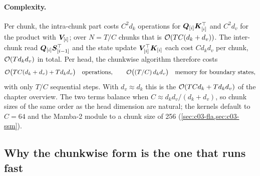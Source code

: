 \paragraph{Complexity.}
Per chunk, the intra-chunk part costs $C^2d_k$ operations for $\bm{Q}_{[i]}\bm{K}_{[i]}^{\top}$ and $C^2d_v$
for the product with $\bm{V}_{[i]}$; over $N=T/C$ chunks that is $\mathcal{O}(TC(d_k+d_v))$. The
inter-chunk read $\bm{Q}_{[i]}\bm{S}_{[i-1]}^{\top}$ and the state update $\bm{V}_{[i]}^{\top}\bm{K}_{[i]}$ each cost
$Cd_kd_v$ per chunk, $\mathcal{O}(Td_kd_v)$ in total. Per head, the chunkwise algorithm therefore costs
\begin{equation}\label{eq:c03-chunk-cost}
  \mathcal{O}\big(TC(d_k+d_v)+Td_kd_v\big)\quad\text{operations},\qquad
  \mathcal{O}\big((T/C)\,d_kd_v\big)\quad\text{memory for boundary states},
\end{equation}
with only $T/C$ sequential steps. With $d_v\approx d_k$ this is the $\mathcal{O}(TCd_k+Td_kd_v)$ of the
chapter overview. The two terms balance when $C\approx d_k d_v/(d_k+d_v)$, so chunk sizes of the
same order as the head dimension are natural; the \fla{} kernels default to $C=64$ and the
Mamba-2 module to a chunk size of 256 (\cref{sec:c03-fla,sec:c03-ssm}).

\subsection{Why the chunkwise form is the one that runs fast}

